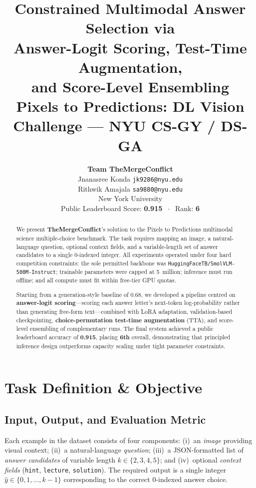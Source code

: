 \documentclass[11pt,twocolumn]{article}
\title{%
  \vspace{-0.8em}%
  {\Large\bfseries\color{black}
    Constrained Multimodal Answer Selection via\\
    Answer-Logit Scoring, Test-Time Augmentation,\\
    and Score-Level Ensembling}\\[0.4em]
  {\normalsize\color{black}
    Pixels to Predictions: DL Vision Challenge --- NYU CS-GY / DS-GA}
}
\author{%
  \textbf{Team TheMergeConflict}\\[0.3em]
  Jnanasree Konda \quad\texttt{jk9286@nyu.edu}\\
  Rithwik Amajala \quad\texttt{sa9880@nyu.edu}\\[0.3em]
  New York University\\[0.2em]
  \small Public Leaderboard Score: \textbf{0.915} $\;\cdot\;$ Rank: \textbf{6}
}
\date{}
\begin{document}
\maketitle
\thispagestyle{fancy}

\begin{abstract}
We present \textbf{TheMergeConflict}'s solution to the Pixels to Predictions multimodal science multiple-choice benchmark. The task requires mapping an image, a natural-language question, optional context fields, and a variable-length set of answer candidates to a single 0-indexed integer. All experiments operated under four hard competition constraints: the sole permitted backbone was \texttt{HuggingFaceTB/SmolVLM-500M-Instruct}; trainable parameters were capped at 5~million; inference must run offline; and all compute must fit within free-tier GPU quotas.

Starting from a generation-style baseline of 0.68, we developed a pipeline centred on \textbf{answer-logit scoring}---scoring each answer letter's next-token log-probability rather than generating free-form text---combined with LoRA adaptation, validation-based checkpointing, \textbf{choice-permutation test-time augmentation} (TTA), and score-level ensembling of complementary runs. The final system achieved a public leaderboard accuracy of \textbf{0.915}, placing \textbf{6th} overall, demonstrating that principled inference design outperforms capacity scaling under tight parameter constraints.
\end{abstract}

\section{Task Definition \& Objective}
\label{sec:task}

\subsection{Input, Output, and Evaluation Metric}

Each example in the dataset consists of four components: (i)~an \emph{image} providing visual context; (ii)~a natural-language \emph{question}; (iii)~a JSON-formatted list of \emph{answer candidates} of variable length $k\in\{2,3,4,5\}$; and (iv)~optional \emph{context fields} (\texttt{hint}, \texttt{lecture}, \texttt{solution}). The required output is a single integer $\hat{y}\in\{0,1,\ldots,k-1\}$ corresponding to the correct 0-indexed answer choice.
\end{document}
